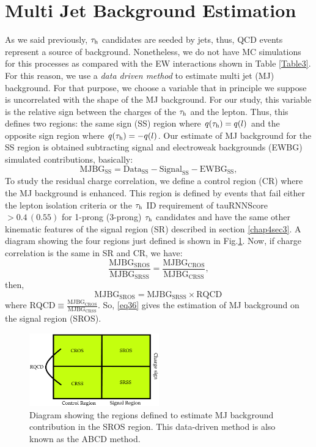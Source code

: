 \section{Multi Jet Background Estimation}
As we said previously, $\tau_\text{h}$ candidates are seeded by jets, thus, QCD events represent a source of background. Nonetheless, we do not have MC simulations for this processes as compared with the EW interactions shown in Table \ref{Table3}. For this reason, we use a \textit{data driven method} to estimate multi jet (MJ) background. For that purpose, we choose a variable that in principle we suppose is uncorrelated with the shape of the MJ background. For our study, this variable is the relative sign between the charges of the $\tau_\text{h}$ and the lepton. Thus, this defines two regions: the same sign (SS) region where $q(\tau_\text{h})=q(l)$ and the opposite sign region where $q(\tau_\text{h})=-q(l)$. Our estimate of MJ background for the SS region is obtained subtracting signal and electroweak backgrounds (EWBG) simulated contributions, basically:
\begin{equation}
\text{MJBG}_{\text{SS}}=\text{Data}_{\text{SS}}-\text{Signal}_{\text{SS}}-\text{EWBG}_{\text{SS}},
\end{equation}
 To study the residual charge correlation, we define a control region (CR) where the MJ background is enhanced. This region is defined by events that fail either the lepton isolation criteria or the $\tau_\text{h}$ ID requirement of tauRNNScore$>0.4\, (0.55)$ for 1-prong (3-prong) $\tau_\text{h}$ candidates and have the same other kinematic features of the signal region (SR) described in section \ref{chap4sec3}. A diagram showing the four regions just defined is shown in Fig.\ref{Fig13}. Now, if charge correlation is the same in SR and CR, we have:
 \begin{equation}
 \frac{\text{MJBG}_{\text{SROS}}}{\text{MJBG}_{\text{SRSS}}}=\frac{\text{MJBG}_{\text{CROS}}}{\text{MJBG}_{\text{CRSS}}},
 \end{equation}
then,
 \begin{equation}
\text{MJBG}_{\text{SROS}}=\text{MJBG}_{\text{SRSS}}\times \text{RQCD}\,
\label{eq36}
\end{equation}
where $\text{RQCD}\equiv\frac{\text{MJBG}_{\text{CROS}}}{\text{MJBG}_{\text{CRSS}}}$. So, \eqref{eq36} gives the estimation of MJ background on the signal region (SROS).
\begin{figure}[h]
	\centering
	\includegraphics[width=0.5\textwidth]{figures/Fig13}
	\caption{Diagram showing the regions defined to estimate MJ background contribution in the SROS region. This data-driven method is also known as the ABCD method.}
	\label{Fig13}
\end{figure}

